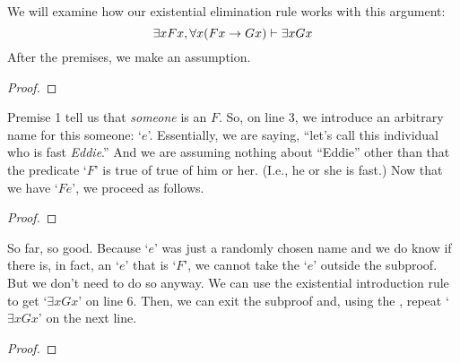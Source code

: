 We will examine how our existential elimination rule works with this argument:
$$\exists x Fx, \forall x(Fx \rightarrow Gx) \vdash \exists x Gx$$
After the premises, we make an assumption.
\begin{proof}
	 \pr{}
	 \pr{}
	\open
		 \as{}
\end{proof}
Premise 1 tell us that \emph{someone} is an $F$.  So, on line 3, we introduce an arbitrary name for this someone: `$e$'. Essentially, we are saying, ``let's call this individual who is fast \textit{Eddie}.'' And we are assuming nothing about ``Eddie'' other than that the predicate `$F$' is true of true of him or her. (I.e., he or she is fast.) Now that we have `$Fe$', we proceed as follows. 
\begin{proof}
	 \pr{}
	 \pr{}
	\open
		 \as{}
		 
\end{proof}
So far, so good. Because `$e$' was just a randomly chosen name and we do know if there is, in fact, an `$e$' that is `$F$', we cannot take the `$e$' outside the subproof. But we don't need to do so anyway. We can use the existential introduction rule to get `$\exists xGx$' on line 6. Then, we can exit the subproof and, using the , repeat `$\exists xGx$' on the next line.
\begin{proof}
	 \pr{}
	 \pr{}
	\open
		 \as{}
		 
	\close
\end{proof}

	\begin{quote}
	\end{quote}

